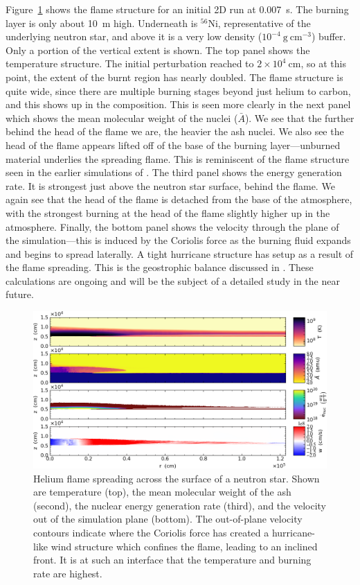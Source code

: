 \documentclass[a4paper]{jpconf}
\newcommand{\isot}[2]{$^{#2}\mathrm{#1}$}
\newcommand{\gcc}{\mathrm{g~cm^{-3} }}
\begin{document}
Figure~\ref{fig:xrb} shows the flame structure for an initial 2D run
at 0.007~s.  The burning layer is only about 10~m high.  Underneath is
\isot{Ni}{56}, representative of the underlying neutron star, and
above it is a very low density ($10^{-4}~\gcc$) buffer.  Only a
portion of the vertical extent is shown.  The top panel shows the
temperature structure.  The initial perturbation reached to $2\times
10^4~\mathrm{cm}$, so at this point, the extent of the burnt region
has nearly doubled.  The flame structure is quite wide, since there
are multiple burning stages beyond just helium to carbon, and this
shows up in the composition.  This is seen more clearly in the next
panel which shows the mean molecular weight of the nuclei ($\bar{A}$).
We see that the further behind the head of the flame we are, the heavier
the ash nuclei.  We also see the head of the flame
appears lifted off of the base of the burning layer---unburned
material underlies the spreading flame.  This is
reminiscent of the flame structure seen in the earlier simulations of
\cite{cavecchi:2012}.  The third panel shows the energy generation rate.
It is strongest just above the neutron star surface, behind the flame.
We again see that the head of the flame is detached from the base
of the atmosphere, with the strongest burning at the head of the flame
slightly higher up in the atmosphere.   Finally, the bottom
panel shows the velocity through the plane of the simulation---this is
induced by the Coriolis force as the burning fluid expands and begins to spread laterally.
A tight hurricane structure has setup as a result of the flame
spreading.  This is the geostrophic balance discussed in
\cite{SPIT_ETAL02}.    These calculations are ongoing and will be
the subject of a detailed study in the near future.

\begin{figure}
\centering
\includegraphics[width=\linewidth]{xrb}
\caption{\label{fig:xrb} Helium flame spreading across the surface of
  a neutron star.  Shown are temperature (top), the mean molecular
  weight of the ash (second), the nuclear energy generation rate
  (third), and the velocity out of the simulation plane (bottom).  The
  out-of-plane velocity contours indicate where the Coriolis force has
  created a hurricane-like wind structure which confines the flame,
  leading to an inclined front. It is at such an interface that the
  temperature and burning rate are highest.  }
\end{figure}
\end{document}
